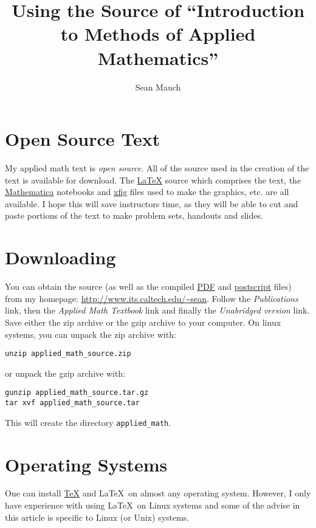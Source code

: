 \documentclass{article}
\title{Using the Source of ``Introduction to Methods of Applied Mathematics''}
\author{Sean Mauch}
\begin{document}
\maketitle



\section{Open Source Text}

My applied math text is \textit{open source}.  All of the source used in the 
creation of the text is available for download.  The 
\href{http://www.latex-project.org/}{\LaTeX} 
source which comprises the text, the 
\href{http://www.wolfram.com/}{Mathematica}
notebooks and 
\href{http://www.xfig.org/}{xfig}
files used to make the graphics, etc. are all available. I hope this will 
save instructors time, as they will be able to cut and paste portions 
of the text to make problem sets, handouts and slides.



\section{Downloading}

You can obtain the source (as well as the compiled 
\href{http://www.adobe.com/products/acrobat/}{PDF}
and 
\href{http://www.cs.wisc.edu/~ghost/}{postscript}
files) from my homepage: 
\href{http://www.its.caltech.edu/~sean}
{http://www.its.caltech.edu/{\~{}}sean}.
Follow the \textit{Publications} link, then the 
\textit{Applied Math Textbook} link and finally the 
\textit{Unabridged version} link.  Save either the zip archive or the gzip 
archive to your computer.  On linux systems, you can unpack the zip archive 
with: 
\begin{verbatim}
unzip applied_math_source.zip
\end{verbatim}
or unpack the gzip archive with:
\begin{verbatim}
gunzip applied_math_source.tar.gz
tar xvf applied_math_source.tar
\end{verbatim}
This will create the directory \verb+applied_math+.



\section{Operating Systems}

One can install 
\href{http://www.tug.org/}{\TeX} and \LaTeX\ on almost any operating system.
However, I only have experience with using \LaTeX\ on Linux systems and
some of the advise in this article is specific to Linux (or Unix) systems.  
\end{document}
